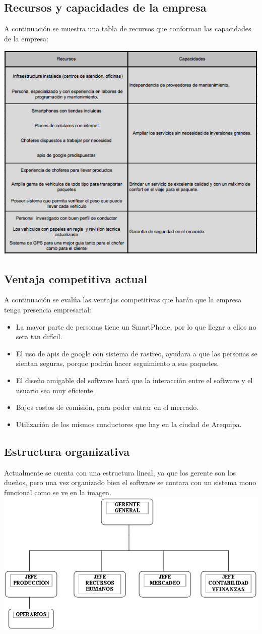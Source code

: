 \subsection{Recursos y capacidades de la empresa}
A continuación se muestra una tabla de recursos que conforman las capacidades de la empresa:

\includegraphics[scale=1.5]{tablaRyC}

\subsection{Ventaja competitiva actual}
A continuación se evalúa las ventajas competitivas que harán que la empresa tenga presencia empresarial:
\begin{itemize}
    \item La mayor parte de personas tiene un SmartPhone, por lo que llegar a ellos no sera tan difícil.
    \item El uso de apis de google con sistema de rastreo, ayudara a que las personas se sientan seguras, porque podrán hacer seguimiento a sus paquetes.
    \item El diseño amigable del software hará que la interacción entre el software y el usuario sea muy eficiente.
    \item Bajos costos de comisión, para poder entrar en el mercado.
    \item Utilización de los mismos conductores que hay en la ciudad de Arequipa.
\end{itemize}

\subsection{Estructura organizativa}
Actualmente se cuenta con una estructura lineal, ya que los gerente son los dueños, pero una vez organizado bien el software se contara con un sistema mono funcional como se ve en la imagen.
\includegraphics[scale=1.5]{planNegocios}
